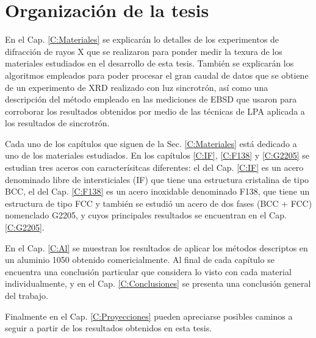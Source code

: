 \section{Organización de la tesis}\label{S:Org}
En el Cap. \ref{C:Materiales} se explicarán lo detalles de los experimentos de difracción de rayos X que se realizaron para ponder medir la texura de los materiales estudiados en el desarrollo de esta tesis. 
También se explicarán los algoritmos empleados para poder procesar el gran caudal de datos que se obtiene de un experimento de XRD realizado con luz sincrotrón, así como una descripción del método empleado en las mediciones de EBSD que usaron para corroborar los resultados obtenidos por medio de las técnicas de LPA aplicada a los resultados de sincrotrón.

Cada uno de los capítulos que siguen de la Sec. \ref{C:Materiales} está dedicado a uno de los materiales estudiados.
En los capítulos \ref{C:IF}, \ref{C:F138} y \ref{C:G2205} se estudian tres aceros con caracterísitcas diferentes: el del Cap. \ref{C:IF} es un acero denominado libre de intersticiales (IF) que tiene una estructura cristalina de tipo BCC, el del Cap. \ref{C:F138} es un acero inoxidable denominado F138, que tiene un estructura de tipo FCC y también se estudió un acero de dos fases (BCC + FCC) nomenclado G2205, y cuyos principales resultados se encuentran en el Cap. \ref{C:G2205}.

En el Cap. \ref{C:Al} se muestran los resultados de aplicar los métodos descriptos en un aluminio 1050 obtenido comericialmente.
Al final de cada capítulo se encuentra una conclusión particular que considera lo visto con cada material individualmente, y en el Cap. \ref{C:Conclusiones} se presenta una conclusión general del trabajo.

Finalmente en el Cap. \ref{C:Proyecciones} pueden apreciarse posibles caminos a seguir a partir de los resultados obtenidos en esta tesis.

